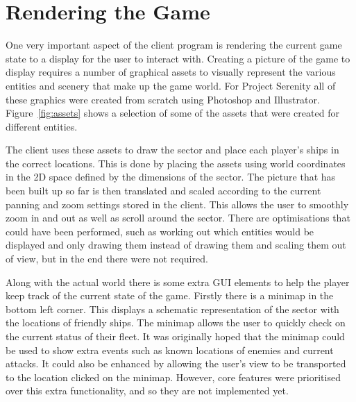 \section{Rendering the Game}



One very important aspect of the client program is rendering the current game state to a display for the user to interact with. Creating a picture of the game to display requires a number of graphical assets to visually represent the various entities and scenery that make up the game world. For Project Serenity all of these graphics were created from scratch using Photoshop and Illustrator. Figure~\ref{fig:assets} shows a selection of some of the assets that were created for different entities.


%

The client uses these assets to draw the sector and place each player's ships in the correct locations. This is done by placing the assets using world coordinates in the 2D space defined by the dimensions of the sector. The picture that has been built up so far is then translated and scaled according to the current panning and zoom settings stored in the client. This allows the user to smoothly zoom in and out as well as scroll around the sector. There are optimisations that could have been performed, such as working out which entities would be displayed and only drawing them instead of drawing them and scaling them out of view, but in the end there were not required.

Along with the actual world there is some extra GUI elements to help the player keep track of the current state of the game. Firstly there is a minimap in the bottom left corner. This displays a schematic representation of the sector with the locations of friendly ships. The minimap allows the user to quickly check on the current status of their fleet. It was originally hoped that the minimap could be used to show extra events such as known locations of enemies and current attacks. It could also be enhanced by allowing the user's view to be transported to the location clicked on the minimap. However, core features were prioritised over this extra functionality, and so they are not implemented yet.

